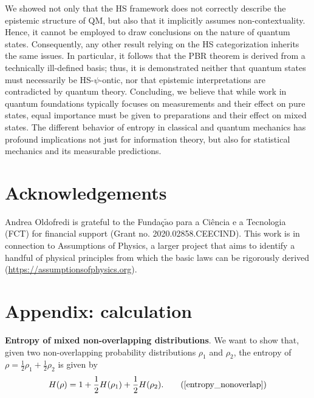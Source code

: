 \documentclass[twocolumn,prl,floatfix,superscriptaddress]{revtex4-2}
\begin{document}
We showed not only that the HS framework does not correctly describe the epistemic structure of QM, but also that it implicitly assumes non-contextuality. Hence, it cannot be employed to draw conclusions on the nature of quantum states. Consequently, any other result relying on the HS categorization inherits the same issues. In particular, it follows that the PBR theorem is derived from a technically ill-defined basis; thus, it is demonstrated neither that quantum states must necessarily be HS-$\psi$-ontic, nor that epistemic interpretations are contradicted by quantum theory. Concluding, we believe that while work in quantum foundations typically focuses on measurements and their effect on pure states, equal importance must be given to preparations and their effect on mixed states. The different behavior of entropy in classical and quantum mechanics has profound implications not just for information theory, but also for statistical mechanics and its measurable predictions. 



\section{Acknowledgements}

Andrea Oldofredi is grateful to the Funda\c{c}$\tilde{\mathrm{a}}$o para a Ci\^encia e a Tecnologia (FCT) for financial support (Grant no. 2020.02858.CEECIND).  This work is in connection to Assumptions of Physics, a larger project that aims to identify a handful of physical principles from which the basic laws can be rigorously derived  (\url{https://assumptionsofphysics.org}).

%

\clearpage

\section*{Appendix: calculation}
\label{A}
\textbf{Entropy of mixed non-overlapping distributions}. We want to show that, given two non-overlapping probability distributions $\rho_1$ and $\rho_2$, the entropy of $\rho = \frac{1}{2} \rho_1 + \frac{1}{2} \rho_2$ is given by
\begin{equation}
	H(\rho) = 1 + \frac{1}{2} H(\rho_1) + \frac{1}{2} H(\rho_2). \tag{\ref{entropy_nonoverlap}}
\end{equation}
\end{document}
